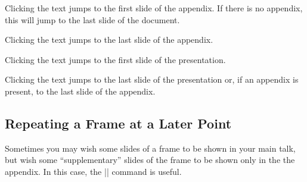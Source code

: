 \begin{command}{\hyperlinkappendixstart{}}
  Clicking the text jumps to the first slide of the appendix. If there is no appendix, this will jump to the last slide of the document.
\end{command}

\begin{command}{\hyperlinkappendixend{}}
  Clicking the text jumps to the last slide of the appendix.
\end{command}

\begin{command}{\hyperlinkdocumentstart{}}
  Clicking the text jumps to the first slide of the presentation.
\end{command}

\begin{command}{\hyperlinkdocumentend{}}
  Clicking the text jumps to the last slide of the presentation or, if an appendix is present, to the last slide of the appendix.
\end{command}


\subsection{Repeating a Frame at a Later Point}

Sometimes you may wish some slides of a frame to be shown in your main talk, but wish some ``supplementary'' slides of the frame to be shown only in the the appendix. In this case, the |\againframe| command is useful.

